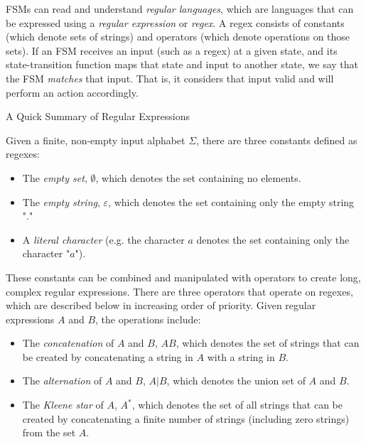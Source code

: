 FSMs can read and understand \textit{regular languages}, which are languages that can be expressed using a \textit{regular expression} or \textit{regex}. A regex consists of constants (which denote sets of strings) and operators (which denote operations on those sets). If an FSM receives an input (such as a regex) at a given state, and its state-transition function maps that state and input to another state, we say that the FSM \textit{matches} that input. That is, it considers that input valid and will perform an action accordingly.

\begin{bluebox}{A Quick Summary of Regular Expressions}

    Given a finite, non-empty input alphabet $\Sigma$, there are three constants defined as regexes:
    
    \vspace{4mm}
    \begin{itemize}
        \item The \textit{empty set}, $\emptyset$, which denotes the set containing no elements.
        \item The \textit{empty string}, $\varepsilon$, which denotes the set containing only the empty string "."
        \item A \textit{literal character} (e.g. the character $a$ denotes the set containing only the character "$a$").
    \end{itemize}
    \vspace{4mm}
        
    These constants can be combined and manipulated with operators to create long, complex regular expressions. There are three operators that operate on regexes, which are described below in increasing order of priority. Given regular expressions $A$ and $B$, the operations include:
    
    \vspace{4mm}
    \begin{itemize}
        \item The \textit{concatenation} of $A$ and $B$, $AB$, which denotes the set of strings that can be created by concatenating a string in $A$ with a string in $B$.
        \item The \textit{alternation} of $A$ and $B$, $A|B$, which denotes the union set of $A$ and $B$.
        \item The \textit{Kleene star} of $A$, $A^*$, which denotes the set of all strings that can be created by concatenating a finite number of strings (including zero strings) from the set $A$.
    \end{itemize}
    \vspace{4mm}
        

\end{bluebox}
